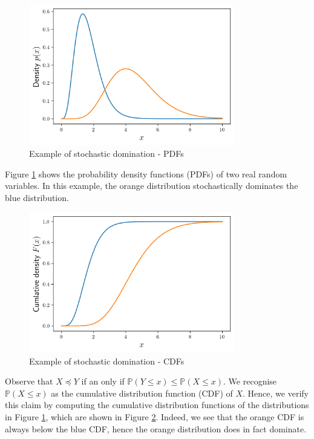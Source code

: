 \begin{figure}[h]
	\centering
	\includegraphics[width=0.8\textwidth]{./figures/stochastic_domination_pdf.png}
	\caption{Example of stochastic domination - PDFs}
	\label{fig:stochDomPDFs}
\end{figure}

Figure \ref{fig:stochDomPDFs} shows the probability density functions (PDFs) of two real random variables. In this example, the orange distribution stochastically dominates the blue distribution.

\begin{figure}[h]
	\centering
	\includegraphics[width=0.8\textwidth]{./figures/stochastic_domination_cdf.png}
	\caption{Example of stochastic domination - CDFs}
	\label{fig:stochDomCDFs}
\end{figure}

Observe that $X \preceq Y$ if an only if $\mathbb{P}(Y \leq x) \leq \mathbb{P}(X \leq x)$. We recognise $\mathbb{P}(X \leq x)$ as the cumulative distribution function (CDF) of $X$. Hence, we verify this claim by computing the cumulative  distribution functions of the distributions in Figure \ref{fig:stochDomPDFs}, which are shown in Figure \ref{fig:stochDomCDFs}. Indeed, we see that the orange CDF is always below the blue CDF, hence the orange distribution does in fact dominate. %

